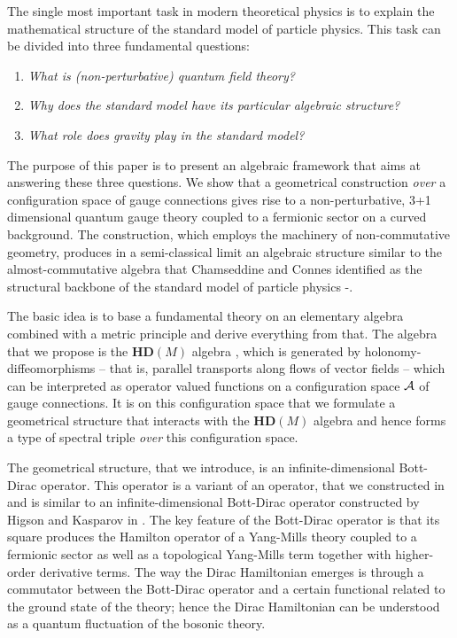 \documentclass[letterpaper,11pt]{article}
\def\ca{{\cal A}}
\begin{document}
The single most important task in modern theoretical physics is to explain the mathematical structure of the standard model of particle physics.
This task can be divided into three fundamental questions:
\begin{enumerate}
\item
{\it What is (non-perturbative) quantum field theory?}
\item
{\it Why does the standard model have its particular algebraic structure?} 
\item
{\it What role does gravity play in the standard model?}
\end{enumerate}
The purpose of this paper is to present an algebraic framework that aims at answering these three questions. We show that a geometrical construction {\it over} a configuration space of gauge connections gives rise to a non-perturbative, 3+1 dimensional quantum gauge theory coupled to a fermionic sector on a curved background. The construction, which employs the machinery of non-commutative geometry, produces in a semi-classical limit an algebraic structure similar to the almost-commutative algebra that Chamseddine and Connes identified as the structural backbone of the standard model of particle physics \cite{Connes:1996gi}-\cite{Chamseddine:2012sw}.







The basic idea is to base a fundamental theory on an elementary algebra combined with a metric principle and derive everything from that.  The algebra that we propose is the $\mathbf{HD}(M)$ algebra \cite{Aastrup:2012vq,AGnew}, which is generated by holonomy-diffeomorphisms -- that is, parallel transports along flows of vector fields -- which can be interpreted as operator valued functions on a configuration space $\ca$ of gauge connections. It is on this configuration space that we formulate a geometrical structure that interacts with the $\mathbf{HD}(M)$ algebra and hence forms a type of spectral triple {\it over} this configuration space.

The geometrical structure, that we introduce, is an infinite-dimensional Bott-Dirac operator. This operator is a variant of an operator, that we constructed in \cite{Aastrup:2019yui,Aastrup:2017atr} and is similar to an infinite-dimensional Bott-Dirac operator constructed by Higson and Kasparov in \cite{Higson}. 
The key feature of the Bott-Dirac operator is that its square produces the Hamilton operator of a Yang-Mills theory coupled to a fermionic sector as well as a topological Yang-Mills term together with higher-order derivative terms. The way the Dirac Hamiltonian emerges is through a commutator between the Bott-Dirac operator and a certain functional related to the ground state of the theory; hence the Dirac Hamiltonian can be understood as a quantum fluctuation of the bosonic theory. 
\end{document}
